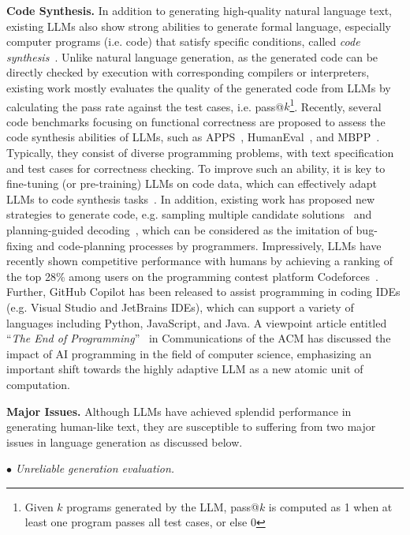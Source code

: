 {{{{{\textbf{Code Synthesis.} In addition to generating high-quality natural language text, existing LLMs also show strong abilities to generate {formal language, especially  computer programs (i.e. code)} that satisfy specific conditions, called \emph{code synthesis}~\cite{Gulwani-Found-2017-Program}. Unlike natural language generation, as the generated code can be directly checked by execution with corresponding compilers or interpreters, existing work mostly evaluates the quality of the generated code from LLMs by calculating the pass rate against the test cases, i.e. pass@$k$\footnote{Given $k$ programs generated by the LLM, pass@$k$ is computed as 1 when at least one program passes all test cases, or else 0}. Recently, several code benchmarks focusing on functional correctness are proposed to assess the code synthesis abilities of LLMs, such as APPS~\cite{Hendrycks-nips-2021-Measuring}, HumanEval~\cite{Chen-arxiv-2021-evaluating}, and MBPP~\cite{Austin-arxiv-2021-Program}. Typically, they consist of diverse programming problems, with text specification and test cases for correctness checking. To improve such an ability, it is key to fine-tuning (or pre-training) LLMs on code data, which can effectively adapt LLMs to code synthesis tasks~\cite{nijkamp-arxiv-2022-Codegen}. {In addition, existing work  has proposed new strategies to generate code, e.g. sampling multiple candidate solutions~\cite{Austin-arxiv-2021-Program} and planning-guided decoding~\cite{Zhang-ICLR-2023-Planning}, which can be considered as the imitation of bug-fixing and code-planning processes by  programmers.} Impressively,  LLMs have recently shown competitive performance with humans by achieving a ranking of the top 28\% among users on the programming contest platform Codeforces~\cite{Li-Science-2022-AlphaCode}. Further, GitHub Copilot has been released to assist programming in coding IDEs (e.g. Visual Studio and JetBrains IDEs), which can support  a variety of  languages including Python, JavaScript, and Java. A viewpoint article entitled ``\emph{The End of Programming}''~\cite{Welsh-ACM-2023-The} in Communications of the ACM  has discussed the impact of AI programming in the field of computer science, emphasizing an important shift towards the highly adaptive LLM as a new atomic  unit of computation. 

\textbf{Major Issues.} Although LLMs have achieved splendid performance in generating human-like text, they are susceptible to suffering from two major issues in language generation as discussed below.

$\bullet$ \emph{Unreliable generation evaluation.}
\label{sec:generation-eval}

}}}}}
